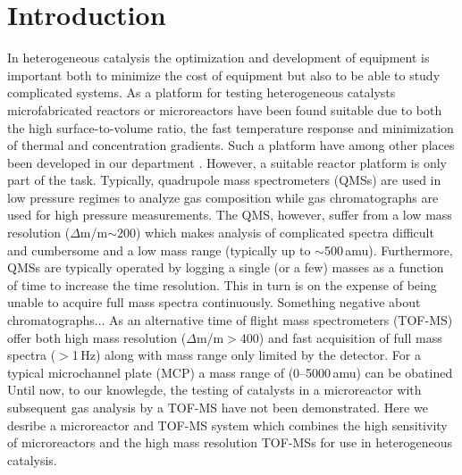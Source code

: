 \documentclass[aip,rsi]{revtex4-1}
\begin{document}
\section{Introduction}
In heterogeneous catalysis the optimization and development of equipment is important both to minimize the cost of equipment but also to be able to study complicated systems. As a platform for testing heterogeneous catalysts microfabricated reactors or microreactors have been found suitable due to both the high surface-to-volume ratio, the fast temperature response and minimization of thermal and concentration gradients. Such a platform have among other places been developed in our department \cite{Henriksen2009}. However, a suitable reactor platform is only part of the task. Typically, quadrupole mass spectrometers (QMSs) are used in low pressure regimes to analyze gas composition while gas chromatographs are used for high pressure measurements. The QMS, however, suffer from a low mass resolution ($\Delta$m/m$\sim$200) which makes analysis of complicated spectra difficult and cumbersome and a low mass range (typically up to $\sim$500\,amu). Furthermore, QMSs are typically operated by logging a single (or a few) masses as a function of time to increase the time resolution. This in turn is on the expense of being unable to acquire full mass spectra continuously. Something negative about chromatographs... As an alternative time of flight mass spectrometers (TOF-MS) offer both high mass resolution ($\Delta$m/m$>$400) and fast acquisition of full mass spectra ($>$1\,Hz) along with mass range only limited by the detector. For a typical microchannel plate (MCP) a mass range of (0--5000\,amu) can be obatined Until now, to our knowlegde, the testing of catalysts in a microreactor with subsequent gas analysis by a TOF-MS have not been demonstrated. Here we desribe a microreactor and TOF-MS system which combines the high sensitivity of microreactors and the high mass resolution TOF-MSs for use in heterogeneous catalysis.
\end{document}

